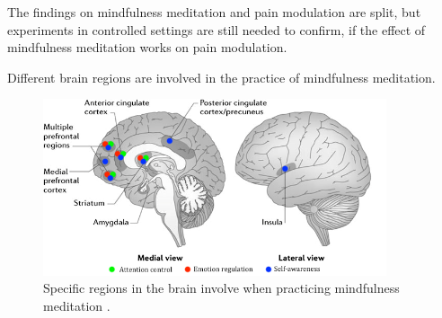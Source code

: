The findings on mindfulness meditation and pain modulation are split, but experiments in controlled settings are still needed to confirm, if the effect of mindfulness meditation works on pain modulation. \cite{Zeidan2012, Perlman2010}




Different brain regions are involved in the practice of mindfulness meditation. 

\begin{figure}[H]
	\includegraphics[width=0.9\textwidth]{figures/brain_meditation.png} 
	\caption{Specific regions in the brain involve when practicing mindfulness meditation \cite{Tang2017}.}
	\label{fig:brain_meditation}  
\end{figure}


